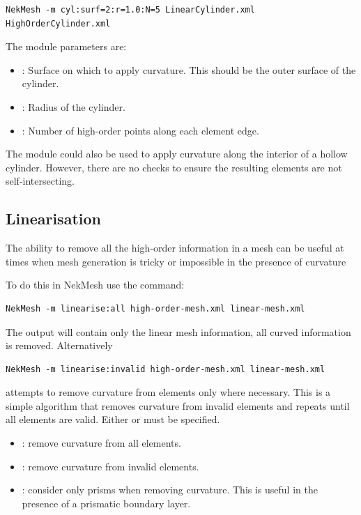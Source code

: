 \begin{lstlisting}[style=BashInputStyle]
NekMesh -m cyl:surf=2:r=1.0:N=5 LinearCylinder.xml HighOrderCylinder.xml
\end{lstlisting}

The module parameters are:

\begin{itemize}
  \item {}: Surface on which to apply curvature. This should be the
  outer surface of the cylinder.
  \item {}: Radius of the cylinder.
  \item {}: Number of high-order points along each element edge.
\end{itemize}

\begin{notebox}
  The module could also be used to apply curvature along the interior of a
  hollow cylinder. However, there are no checks to ensure the resulting elements
  are not self-intersecting.
\end{notebox}

\subsection{Linearisation}

The ability to remove all the high-order information in a mesh can be useful at
times when mesh generation is tricky or impossible in the presence of curvature

To do this in NekMesh use the command:

\begin{lstlisting}[style=BashInputStyle]
  NekMesh -m linearise:all high-order-mesh.xml linear-mesh.xml
\end{lstlisting}

The output will contain only the linear mesh information, all curved information
is removed. Alternatively

\begin{lstlisting}[style=BashInputStyle]
  NekMesh -m linearise:invalid high-order-mesh.xml linear-mesh.xml
\end{lstlisting}

attempts to remove curvature from elements only where necessary. This is a
simple algorithm that removes curvature from invalid elements and repeats until
all elements are valid. Either  or  must be specified.

\begin{itemize}
  \item {}: remove curvature from all elements.
  \item {}: remove curvature from invalid elements.
  \item {}: consider only prisms when removing curvature. This is
  useful in the presence of a prismatic boundary layer.
\end{itemize}

